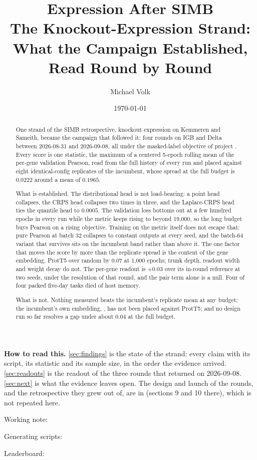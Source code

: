 \documentclass[10pt,a4paper]{article}
\title{\vspace{-1.5em}Expression After SIMB\\
  {\large The Knockout-Expression Strand: What the Campaign Established,\\
   Read Round by Round}}
\author{Michael Volk}
\date{\today}
\begin{document}
\maketitle
\thispagestyle{empty}

\begin{abstract}
\noindent
One strand of the SIMB retrospective, knockout expression on Kemmeren and Sameith, became
the campaign that followed it: four rounds on IGB and Delta between 2026-08-31 and
2026-09-08, all under the masked-label objective of project .
Every score is one statistic, the maximum of a centered 5-epoch rolling mean of the
per-gene validation Pearson, read from the full history of every run and placed against
eight identical-config replicates of the incumbent, whose spread at the full budget is
$0.0222$ around a mean of $0.1965$.

What is established. The distributional head is not load-bearing: a point head collapses,
the CRPS head collapses two times in three, and the Laplace-CRPS head ties the quantile
head to $0.0005$. The validation loss bottoms out at a few hundred epochs in every run
while the metric keeps rising to beyond 19,000, so the long budget buys Pearson on a rising
objective. Training on the metric itself does not escape that: pure Pearson at batch 32
collapses to constant outputs at every seed, and the batch-64 variant that survives sits on
the incumbent band rather than above it. The one factor that moves the score by more than
the replicate spread is the content of the gene embedding, ProtT5 over random by $0.07$ at
1,000 epochs; trunk depth, readout width and weight decay do not. The per-gene readout is
$+0.03$ over its in-round reference at two seeds, under the resolution of that round, and
the pair term alone is a null. Four of four packed five-day tasks died of host memory.

What is not. Nothing measured beats the incumbent's replicate mean at any budget; the
incumbent's own embedding, , has not been placed against ProtT5; and no design
run so far resolves a gap under about $0.04$ at the full budget.
\end{abstract}

\vspace{0.5em}
{\small\color{tcgray}
\textbf{How to read this.} \cref{sec:findings} is the state of the strand: every claim with
its script, its statistic and its sample size, in the order the evidence arrived.
\cref{sec:readouts} is the readout of the three rounds that returned on 2026-09-08.
\cref{sec:next} is what the evidence leaves open. The design and launch of the rounds,
and the retrospective they grew out of, are in 
(sections 9 and 10 there), which is not repeated here.\par\smallskip

Working note: \par
Generating scripts: \par
Leaderboard: \par}

\vspace{1em}
\tccontents

\clearpage



\end{document}
